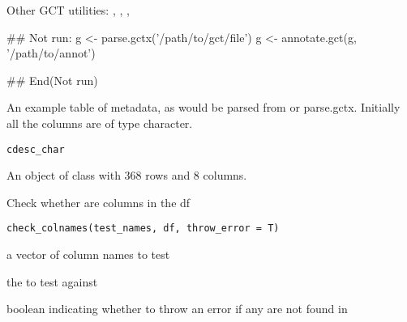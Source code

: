 \documentclass[letterpaper]{book}
\begin{document}
%
\begin{SeeAlso}\relax
Other GCT utilities: ,
, ,
\end{SeeAlso}
%
\begin{Examples}
\begin{ExampleCode}
## Not run: 
 g <- parse.gctx('/path/to/gct/file')
 g <- annotate.gct(g, '/path/to/annot')

## End(Not run)

\end{ExampleCode}
\end{Examples}
%
\begin{Description}\relax
An example table of metadata, as would be
parsed from or parse.gctx. Initially all the
columns are of type character.
\end{Description}
%
\begin{Usage}
\begin{verbatim}
cdesc_char
\end{verbatim}
\end{Usage}
%
\begin{Format}
An object of class  with 368 rows and 8 columns.
\end{Format}
%
\begin{Description}\relax
Check whether  are columns in the  df
\end{Description}
%
\begin{Usage}
\begin{verbatim}
check_colnames(test_names, df, throw_error = T)
\end{verbatim}
\end{Usage}
%
\begin{Arguments}
\begin{ldescription}
\item[\code{test\_names}] a vector of column names to test

\item[\code{df}] the  to test against

\item[\code{throw\_error}] boolean indicating whether to throw an error if
any  are not found in 
\end{ldescription}
\end{Arguments}
\end{document}
